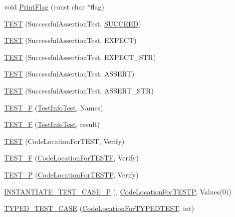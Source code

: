 \begin{DoxyCompactItemize}
void \hyperlink{namespacetesting_a9863402455bfcf9be5fc0b1453a6d97d}{Print\+Flag} (const char $\ast$flag)
\item 
\hyperlink{namespacetesting_ae0cbea692840c88ab0b03285eb69ac97}{T\+E\+ST} (Successful\+Assertion\+Test, \hyperlink{gtest_8h_a75adcdf89f69b0b615e395daafc315af}{S\+U\+C\+C\+E\+ED})
\item 
\hyperlink{namespacetesting_af6c8f998f934372e5687d3998068e5e4}{T\+E\+ST} (Successful\+Assertion\+Test, E\+X\+P\+E\+CT)
\item 
\hyperlink{namespacetesting_a9b1e4b53f277d25e6d6413a0004481bb}{T\+E\+ST} (Successful\+Assertion\+Test, E\+X\+P\+E\+C\+T\+\_\+\+S\+TR)
\item 
\hyperlink{namespacetesting_afbe4c8233faff6eba04902b3cb041632}{T\+E\+ST} (Successful\+Assertion\+Test, A\+S\+S\+E\+RT)
\item 
\hyperlink{namespacetesting_a83dfac108c207258287b9f7aa9171e8a}{T\+E\+ST} (Successful\+Assertion\+Test, A\+S\+S\+E\+R\+T\+\_\+\+S\+TR)
\item 
\hyperlink{namespacetesting_acd53db89097aba1468724d6446069b1e}{T\+E\+S\+T\+\_\+F} (\hyperlink{classtesting_1_1TestInfoTest}{Test\+Info\+Test}, Names)
\item 
\hyperlink{namespacetesting_ab00e29c00b3e29cdfa21d23b79dd3776}{T\+E\+S\+T\+\_\+F} (\hyperlink{classtesting_1_1TestInfoTest}{Test\+Info\+Test}, result)
\item 
\hyperlink{namespacetesting_af597d0ad4de0197141b78e9c1035e491}{T\+E\+ST} (Code\+Location\+For\+T\+E\+ST, Verify)
\item 
\hyperlink{namespacetesting_a782ec43081903a0aaa6d009218eba2a8}{T\+E\+S\+T\+\_\+F} (\hyperlink{classtesting_1_1CodeLocationForTESTF}{Code\+Location\+For\+T\+E\+S\+TF}, Verify)
\item 
\hyperlink{namespacetesting_af05768b7e2f14652d2c4f274ba1a5544}{T\+E\+S\+T\+\_\+P} (\hyperlink{classtesting_1_1CodeLocationForTESTP}{Code\+Location\+For\+T\+E\+S\+TP}, Verify)
\item 
\hyperlink{namespacetesting_a5b049e97e9082df909e4a0f740ff5d02}{I\+N\+S\+T\+A\+N\+T\+I\+A\+T\+E\+\_\+\+T\+E\+S\+T\+\_\+\+C\+A\+S\+E\+\_\+P} (, \hyperlink{classtesting_1_1CodeLocationForTESTP}{Code\+Location\+For\+T\+E\+S\+TP}, Values(0))
\item 
\hyperlink{namespacetesting_af0459cc6cdfbbae821caf802c7f2bb72}{T\+Y\+P\+E\+D\+\_\+\+T\+E\+S\+T\+\_\+\+C\+A\+SE} (\hyperlink{classtesting_1_1CodeLocationForTYPEDTEST}{Code\+Location\+For\+T\+Y\+P\+E\+D\+T\+E\+ST}, int)
\item 

\end{DoxyCompactItemize}

